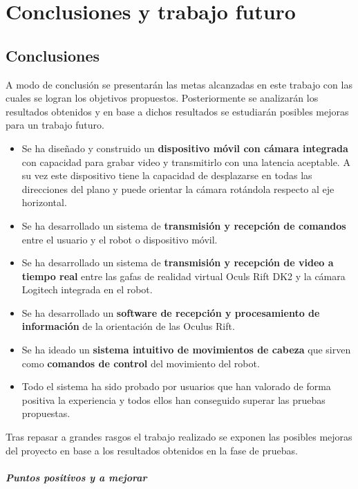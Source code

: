 \documentclass[twoside, 11pt]{epstfg}
\begin{document}
\chapter{Conclusiones y trabajo futuro}
\label{chap:conclusiones}
\vspace{-0.2cm}

\section{Conclusiones}
A modo de conclusión se presentarán las metas alcanzadas en este trabajo con las cuales se logran los objetivos propuestos. Posteriormente se analizarán los resultados obtenidos y en base a dichos resultados se estudiarán posibles mejoras para un trabajo futuro.

\begin{itemize}
	\item Se ha diseñado y construido un \textbf{dispositivo móvil con cámara integrada} con capacidad para grabar video y transmitirlo con una latencia aceptable. A su vez este dispositivo tiene la capacidad de desplazarse en todas las direcciones del plano y puede orientar la cámara rotándola respecto al eje horizontal.
	\item Se ha desarrollado un sistema de \textbf{transmisión y recepción de comandos} entre el usuario y el robot o dispositivo móvil.
	\item Se ha desarrollado un sistema de \textbf{transmisión y recepción de video a tiempo real} entre las gafas de realidad virtual Oculs Rift DK2 y la cámara Logitech integrada en el robot.
	\item Se ha desarrollado un \textbf{software de recepción y procesamiento de información} de la orientación de las Oculus Rift.
	\item Se ha ideado un \textbf{sistema intuitivo de movimientos de cabeza} que sirven como \textbf{comandos de control} del movimiento del robot.
	\item Todo el sistema ha sido probado por usuarios que han valorado de forma positiva la experiencia y todos ellos han conseguido superar las pruebas propuestas.
\end{itemize}

Tras repasar a grandes rasgos el trabajo realizado se exponen las posibles mejoras del proyecto en base a los resultados obtenidos en la fase de pruebas.

\paragraph{Puntos positivos y a mejorar}
\end{document}

